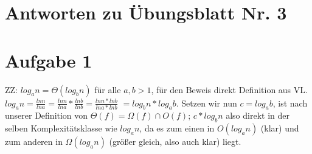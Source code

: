 \documentclass{scrartcl}
\begin{document}
\section*{Antworten zu Übungsblatt Nr. 3}

\section*{Aufgabe 1}
ZZ: $ log_an = \Theta(log_bn) $ für alle $a, b > 1$, für den Beweis direkt Definition aus VL. \\
$log_an = \frac{ln n}{ln a} = \frac{ln n}{ln a} * \frac{ln b}{ln b} = \frac{ln n * ln b}{ln a * ln b} $
$ = log_bn * log_ab $. Setzen wir nun $c = log_ab$, ist nach unserer Definition von $\Theta(f) = \Omega(f) \cap O(f)$;
$ c * log_bn $ also direkt in der selben Komplexitätsklasse wie $ log_an$, da es zum einen in
$O(log_an)$ (klar) und zum anderen in $\Omega(log_an)$ (größer gleich, also auch klar) liegt.
\end{document}
